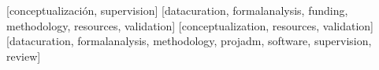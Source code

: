 \documentclass[spanish]{textolivre}
\begin{document}
\printbibliography\label{sec-bib}


\begin{contributors}
[conceptualización, supervision]
[datacuration, formalanalysis, funding, methodology, resources, validation]
[conceptualization, resources, validation]
[datacuration, formalanalysis, methodology, projadm, software, supervision, review]
\end{contributors}
\end{document}

